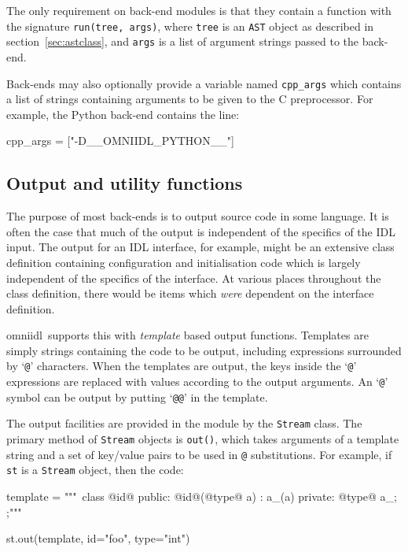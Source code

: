 \documentclass[11pt,twoside,a4paper]{article}
\newcommand{\omniidl}{\textsf{omniidl}}
\newcommand{\func}[1]{\texttt{#1}}
\newcommand{\var}[1]{\texttt{#1}}
\newcommand{\class}[1]{\texttt{#1}}
\begin{document}
The only requirement on back-end modules is that they contain a
function with the signature \func{run(tree, args)}, where \var{tree}
is an \class{AST} object as described in section~\ref{sec:astclass},
and \var{args} is a list of argument strings passed to the back-end.

Back-ends may also optionally provide a variable named \var{cpp\_args}
which contains a list of strings containing arguments to be given to
the C preprocessor. For example, the Python back-end contains the
line:

\begin{pylisting}
cpp_args = ["-D__OMNIIDL_PYTHON__"]
\end{pylisting}



\subsection{Output and utility functions}

The purpose of most back-ends is to output source code in some
language. It is often the case that much of the output is independent
of the specifics of the IDL input. The output for an IDL interface,
for example, might be an extensive class definition containing
configuration and initialisation code which is largely independent of
the specifics of the interface. At various places throughout the class
definition, there would be items which \emph{were} dependent on the
interface definition.

\omniidl\ supports this with \emph{template} based output functions.
Templates are simply strings containing the code to be output,
including expressions surrounded by `\texttt{@}' characters. When the
templates are output, the keys inside the `\texttt{@}' expressions are
replaced with values according to the output arguments. An
`\texttt{@}' symbol can be output by putting `\texttt{@@}' in the
template.

The output facilities are provided in the  module
by the \class{Stream} class. The primary method of \class{Stream}
objects is \func{out()}, which takes arguments of a template string
and a set of key/value pairs to be used in \texttt{@} substitutions.
For example, if \var{st} is a \class{Stream} object, then the code:

\begin{pylisting}
    template = """\
  class @id@ {
  public:
    @id@(@type@ a) : a_(a) {}
  private:
    @type@ a_;
  };"""

    st.out(template, id="foo", type="int")
\end{pylisting}
\end{document}
